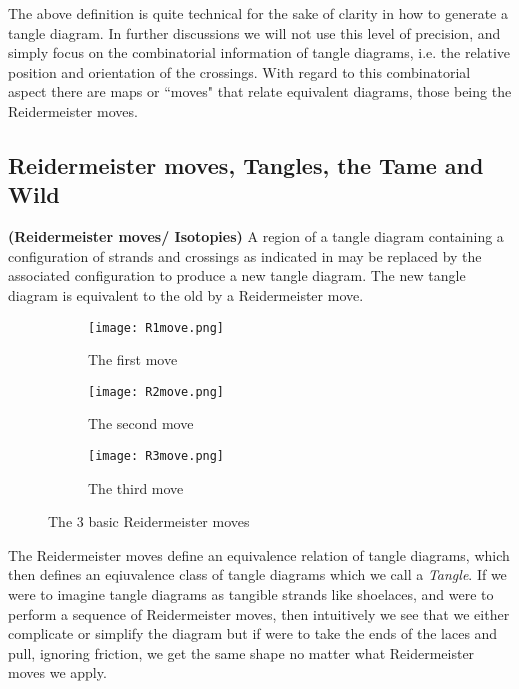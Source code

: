 The above definition is quite technical for the sake of clarity in how to generate a tangle diagram. In further discussions we will not use this level of precision, and simply focus on the combinatorial information of tangle diagrams, i.e. the relative position and orientation of the crossings. With regard to this combinatorial aspect there are maps or ``moves" that relate equivalent diagrams, those being the Reidermeister moves.


\subsection{Reidermeister moves, Tangles, the Tame and Wild}

\begin{definition}\textbf{(Reidermeister moves/ Isotopies)}
A region of a tangle diagram containing a configuration of strands and crossings as indicated in  may be replaced by the associated configuration to produce a new tangle diagram. The new tangle diagram is equivalent to the old by a Reidermeister move.
\begin{figure}[h!]
\centering
\begin{subfigure}{0.31\textwidth}
\centering
\texttt{[image: R1move.png]}
\caption{The first move}
\label{fig:R1move}
\end{subfigure}
\hfill
\begin{subfigure}{0.31\textwidth}
\centering
\texttt{[image: R2move.png]}
\caption{The second move}
\label{fig:R2move}
\end{subfigure}
\hfill
\begin{subfigure}{0.31\textwidth}
\centering
\texttt{[image: R3move.png]}
\caption{The third move}
\label{fig:R3move}
\end{subfigure}
\caption{The 3 basic Reidermeister moves}
\label{fig:Rmoves}
\end{figure}
\end{definition}
The Reidermeister moves define an equivalence relation of tangle diagrams, which then defines an eqiuvalence class of tangle diagrams which we call a \textit{Tangle}. If we were to imagine tangle diagrams as tangible strands like shoelaces, and were to perform a sequence of Reidermeister moves, then intuitively we see that we either complicate or simplify the diagram but if were to take the ends of the laces and pull, ignoring friction, we get the same shape no matter what Reidermeister moves we apply.

